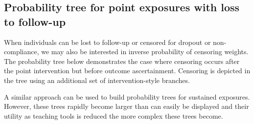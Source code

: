 \documentclass[a4paper]{report}
\begin{document}
\vspace{3pt}

\subsection{Probability tree for point exposures with loss to follow-up}

When individuals can be lost to follow-up or censored for dropout or non-compliance, we may also be interested in inverse probability of censoring weights. The probability tree below demonstrates the case where censoring occurs after the point intervention but before outcome ascertainment. Censoring is depicted in the tree using an additional set of intervention-style branches. 

A similar approach can be used to build probability trees for sustained exposures. However, these trees rapidly become larger than can easily be displayed and their utility as teaching tools is reduced the more complex these trees become.

\newpage
\end{document}
